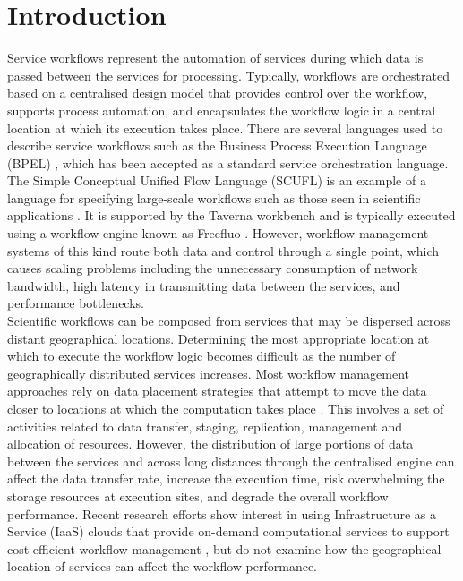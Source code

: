 \documentclass[10pt, conference, compsocconf]{IEEEtran}
\begin{document}
\section{Introduction}\label{Introduction}
Service workflows represent the automation of services during which data is passed between the services for processing.
Typically, workflows are orchestrated based on a centralised design model that provides control over the workflow, supports process automation, and encapsulates the workflow logic in a central location at which its execution takes place.
There are several languages used to describe service workflows such as the Business Process Execution Language (BPEL) \cite{BPEL}, which has been accepted as a standard service orchestration language.
The Simple Conceptual Unified Flow Language (SCUFL) is an example of a language for specifying large-scale workflows such as those seen in scientific applications \cite{CharSci}.
It is supported by the Taverna workbench and is typically executed using a workflow engine known as Freefluo \cite{Taverna}.
However, workflow management systems of this kind route both data and control through a single point, which causes scaling problems including the unnecessary consumption of network bandwidth, high latency in transmitting data between the services, and performance bottlenecks.\\

Scientific workflows can be composed from services that may be dispersed across distant geographical locations.
Determining the most appropriate location at which to execute the workflow logic becomes difficult as the number of geographically distributed services increases.
Most workflow management approaches rely on data placement strategies that attempt to move the data closer to locations at which the computation takes place \cite{DP1, DP2, DP3, DP4, DP5}.
This involves a set of activities related to data transfer, staging, replication, management and allocation of resources.
However, the distribution of large portions of data between the services and across long distances through the centralised engine can affect the data transfer rate, increase the execution time, risk overwhelming the storage resources at execution sites, and degrade the overall workflow performance.
Recent research efforts show interest in using Infrastructure as a Service (IaaS) clouds that provide on-demand computational services to support cost-efficient workflow management \cite{C1, C2}, but do not examine how the geographical location of services can affect the workflow performance.\\
\end{document}
